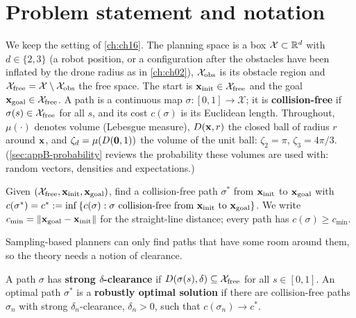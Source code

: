 \section{Problem statement and notation}
\label{sec:ch17-problem}

We keep the setting of \cref{ch:ch16}. The planning space is a box
$\mathcal{X}\subset\mathbb{R}^d$ with $d\in\{2,3\}$ (a robot position, or a
configuration after the obstacles have been inflated by the drone radius as
in \cref{ch:ch02}), $\mathcal{X}_{\mathrm{obs}}$ is its obstacle region and
$\mathcal{X}_{\mathrm{free}}=\mathcal{X}\setminus\mathcal{X}_{\mathrm{obs}}$ the free space. The start is
$\mathbf{x}_{\mathrm{init}}\in\mathcal{X}_{\mathrm{free}}$ and the goal $\mathbf{x}_{\mathrm{goal}}\in\mathcal{X}_{\mathrm{free}}$.
A path is a continuous map $\sigma:[0,1]\to\mathcal{X}$; it is
\textbf{collision-free} if
$\sigma(s)\in\mathcal{X}_{\mathrm{free}}$ for all $s$, and its cost $c(\sigma)$ is its Euclidean
length. Throughout, $\mu(\cdot)$ denotes volume (Lebesgue measure),
$D(\mathbf{x},r)$ the closed ball of radius $r$ around $\mathbf{x}$, and
$\zeta_d=\mu(D(\mathbf{0},1))$ the volume of the unit ball: $\zeta_2=\pi$,
$\zeta_3=4\pi/3$. (\cref{sec:appB-probability} reviews the probability these
volumes are used with: random vectors, densities and expectations.)

\begin{definition}
\label{def:ch17-problem}
Given $(\mathcal{X}_{\mathrm{free}},\mathbf{x}_{\mathrm{init}},\mathbf{x}_{\mathrm{goal}})$, find a collision-free path
$\sigma^*$ from $\mathbf{x}_{\mathrm{init}}$ to $\mathbf{x}_{\mathrm{goal}}$ with
$c(\sigma^*)=c^*:=\inf\left\{ c(\sigma):\sigma\text{ collision-free from }\mathbf{x}_{\mathrm{init}}\text{ to }\mathbf{x}_{\mathrm{goal}} \right\}$.
We write $c_{\min}=\left\lVert \mathbf{x}_{\mathrm{goal}}-\mathbf{x}_{\mathrm{init}} \right\rVert$ for the
straight-line distance; every path has $c(\sigma)\ge c_{\min}$.
\end{definition}

Sampling-based planners can only find paths that have some room around
them, so the theory needs a notion of clearance.

\begin{definition}
\label{def:ch17-clearance}
A path $\sigma$ has \textbf{strong $\delta$-clearance}
if $D(\sigma(s),\delta)\subseteq\mathcal{X}_{\mathrm{free}}$ for all $s\in[0,1]$. An optimal
path $\sigma^*$ is a \textbf{robustly optimal solution}
if there are collision-free paths $\sigma_n$ with strong
$\delta_n$-clearance, $\delta_n>0$, such that $c(\sigma_n)\to c^*$.
\end{definition}

